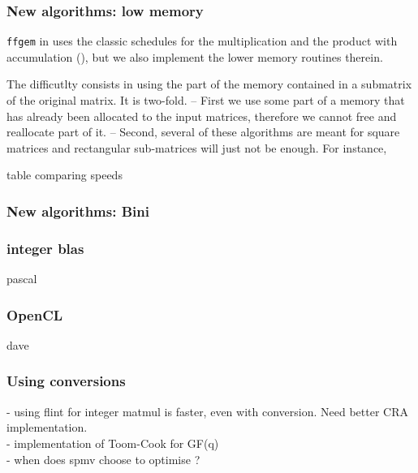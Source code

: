 \subsubsection{New algorithms: low memory}
%
\texttt{ffgem} in \fflas uses the classic schedules for the multiplication and
the product with accumulation (\cf \cite{Boyer:2009:sched}), but we also
implement the lower memory routines therein.
%
\par
%
The difficutlty consists in using the part of the memory contained in a
submatrix of the original matrix. It is two-fold. -- First we use some part
of a memory that has already been allocated to the input matrices, therefore
we cannot free and reallocate part of it. -- Second, several of these algorithms
are meant for square matrices and rectangular sub-matrices will just not be enough.
For instance,
%
\par
%
\danger table comparing speeds
%
\subsubsection{New algorithms: Bini}
%
%
%
\subsubsection{integer blas}
%
\danger pascal
%
\subsubsection{OpenCL}
%
\danger dave
\subsubsection{Using conversions}
- using flint for integer matmul is faster, even with conversion. Need better CRA implementation. \\
- implementation of Toom-Cook for GF(q)\\
- when does spmv choose to optimise ?

